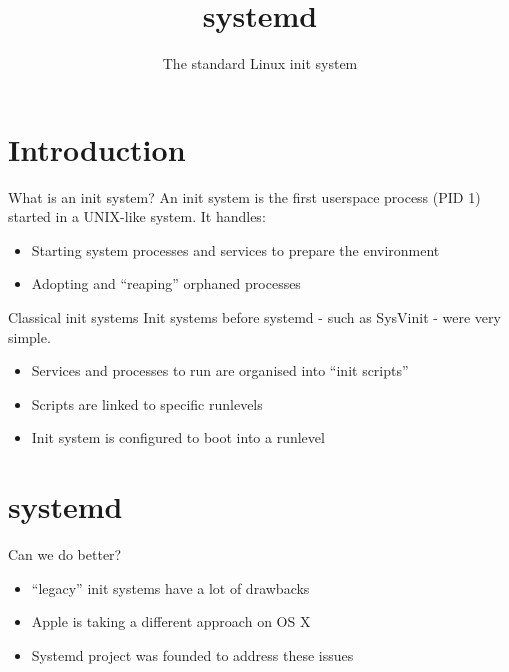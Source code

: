 \documentclass[12pt]{beamer}
\title{systemd}
\subtitle{The standard Linux init system}
\begin{document}

\maketitle

\section{Introduction}

\begin{frame}{What is an init system?}
  An init system is the first userspace process (PID 1) started in a UNIX-like system. It handles:

  \begin{itemize}
  \item Starting system processes and services to prepare the environment
  \item Adopting and ``reaping'' orphaned processes
  \end{itemize}
\end{frame}

\begin{frame}{Classical init systems}
  Init systems before systemd - such as SysVinit - were very simple.

  \begin{itemize}
  \item Services and processes to run are organised into ``init scripts''
  \item Scripts are linked to specific runlevels
  \item Init system is configured to boot into a runlevel
  \end{itemize}

\end{frame}

\section{systemd}

\begin{frame}{Can we do better?}
  \begin{itemize}
  \item ``legacy'' init systems have a lot of drawbacks
  \item Apple is taking a different approach on OS X
  \item Systemd project was founded to address these issues
  \end{itemize}
\end{frame}
\end{document}
